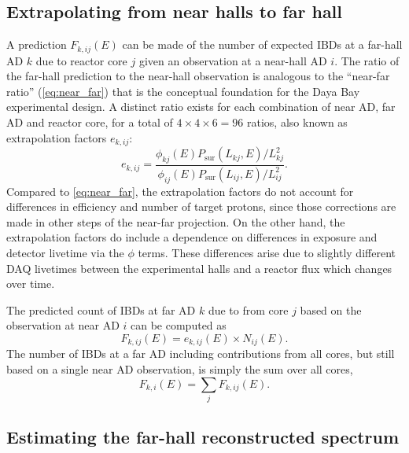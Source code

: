 \subsection{Extrapolating from near halls to far hall}
\label{subsec:extrapolation}

A prediction $F_{k,ij}(E)$ can be made of the number of expected IBDs
at a far-hall AD $k$ due to reactor core $j$
given an observation at a near-hall AD $i$.
The ratio of the far-hall prediction to the near-hall observation
is analogous to the ``near-far ratio'' (\cref{eq:near_far})
that is the conceptual foundation
for the Daya Bay experimental design.
A distinct ratio exists for each combination of near AD, far AD and reactor core,
for a total of $4 \times 4 \times 6 = 96$ ratios, also known as extrapolation factors
$e_{k,ij}$:
\begin{equation}\label{eq:extrapolation}
    e_{k,ij} = \frac{\phi_{kj}(E)P_\text{sur}(L_{kj}, E)/L_{kj}^2}{
        \phi_{ij}(E)P_\text{sur}(L_{ij}, E)/L_{ij}^2
    }.
\end{equation}
Compared to \cref{eq:near_far}, the extrapolation factors
do not account for differences in efficiency and number of target protons,
since those corrections are made in other steps of the near-far projection.
On the other hand, the extrapolation factors do include a dependence on
differences in \nuebar{} exposure and detector livetime via the $\phi$ terms.
These differences arise due to slightly different DAQ livetimes
between the experimental halls
and a reactor flux which changes over time.

The predicted count of IBDs at far AD $k$ due to \nuebar{} from core $j$
based on the observation at near AD $i$ can be computed as
\begin{equation}
    F_{k,ij}(E) = e_{k,ij}(E) \times N_{ij}(E).
\end{equation}
The number of IBDs at a far AD including contributions from all cores,
but still based on a single near AD observation,
is simply the sum over all cores,
\begin{equation}
    F_{k,i}(E) = \sum_j F_{k,ij}(E).
\end{equation}

\subsection{Estimating the far-hall reconstructed spectrum}
\label{subsec:true_to_reco_farhall}


